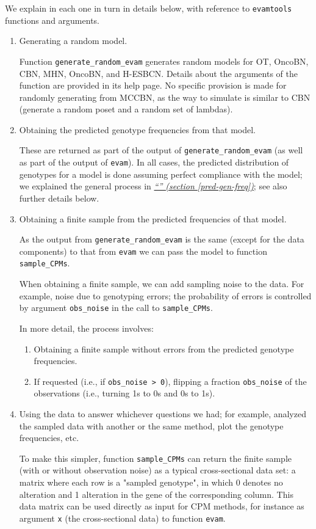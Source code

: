 \documentclass[a4paper,11pt]{article}
\newcommand*{\qref}[1]{\hyperref[{#1}]{\textit{``\nameref*{#1}'' (section \ref*{#1})}}}
\begin{document}
We explain in each one in turn in details below, with reference to \texttt{evamtools} functions and arguments.

\begin{enumerate}
\item Generating a random model.
  
  Function \texttt{generate\_random\_evam} generates random models for OT, OncoBN, CBN, MHN, OncoBN, and H-ESBCN. Details about the arguments of the function are provided in its help page. No specific provision is made for randomly generating from MCCBN, as the way to simulate is similar to CBN (generate a random poset and a random set of lambdas).

\item Obtaining the predicted genotype frequencies from that model.
  
  These are returned as part of the output of \texttt{generate\_random\_evam} (as well as part of the output of \texttt{evam}). In all cases, the predicted distribution of genotypes for a model is done assuming perfect compliance with the model; we explained the general process in \qref{pred-gen-freq}; see also further details below.

\item Obtaining a finite sample from the predicted frequencies of that model.

  As the output from \texttt{generate\_random\_evam} is the same (except for the data components) to that from \texttt{evam} we can pass the model to function \texttt{sample\_CPMs}.

  When obtaining a finite sample, we can add sampling noise to the data. For example, noise due to genotyping errors; the probability of errors is controlled by argument \texttt{obs\_noise} in the call to \texttt{sample\_CPMs}.

  In more detail, the process involves:
  \begin{enumerate}
  \item Obtaining a finite sample without errors from the predicted genotype frequencies.
  \item If requested (i.e., if \texttt{obs\_noise > 0}), flipping a fraction \texttt{obs\_noise} of the observations (i.e., turning 1s to 0s and 0s to 1s).
  \end{enumerate}
  
\item Using the data to answer whichever questions we had; for example, analyzed the sampled data with another or the same method, plot the genotype frequencies, etc.

  To make this simpler, function \texttt{sample\_CPMs} can return the finite sample (with or without observation noise) as a typical cross-sectional data set: a matrix where each row is a "sampled genotype", in which 0 denotes no alteration and 1 alteration in the gene of the corresponding column. This data matrix can be used directly as input for CPM methods, for instance as argument \texttt{x} (the cross-sectional data) to function \texttt{evam}.

  
\end{enumerate}
\end{document}
